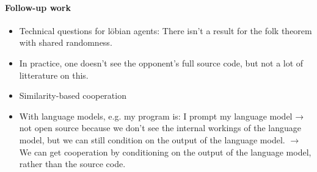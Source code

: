 \documentclass{article}
\begin{document}
\paragraph{Follow-up work}
\begin{itemize}
    \item Technical questions for löbian agents: There isn't a result for the folk theorem with shared randomness.
    \item In practice, one doesn't see the opponent's full source code, but not a lot of litterature on this.
    \item Similarity-based cooperation
    \item With language models, e.g. my program is: I prompt my language model → not open source because we don't see the internal workings of the language model, but we can still condition on the output of the language model. $\to$ We can get cooperation by conditioning on the output of the language model, rather than the source code.
\end{itemize}

\printbibliography
\end{document}
